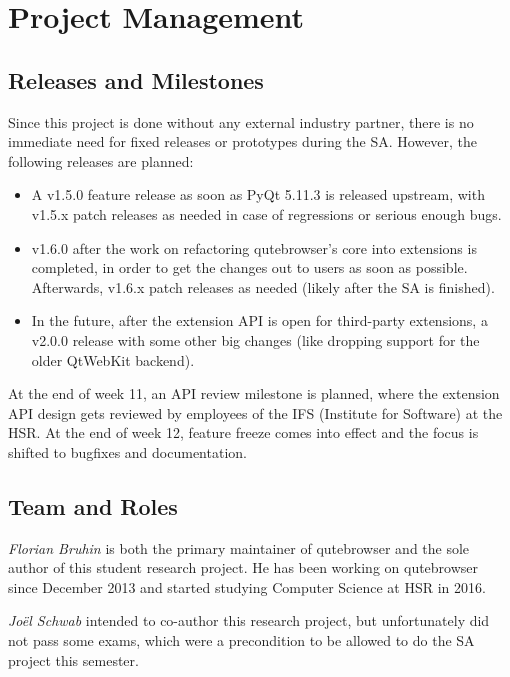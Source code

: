 
\chapter{Project Management}
\label{ch:projectman}

\section{Releases and Milestones}
\label{sec:releases}

Since this project is done without any external industry partner, there is no
immediate need for fixed releases or prototypes during the SA. However, the
following releases are planned:

\begin{itemize}
  \item A v1.5.0 feature release as soon as PyQt 5.11.3 is released upstream,
    with v1.5.x patch releases as needed in case of regressions or serious
    enough bugs.
  \item v1.6.0 after the work on refactoring qutebrowser's core into extensions
    is completed, in order to get the changes out to users as soon as possible.
    Afterwards, v1.6.x patch releases as needed (likely after the SA is finished).
  \item In the future, after the extension API is open for third-party
    extensions, a v2.0.0 release with some other big changes (like dropping support
    for the older QtWebKit backend).
\end{itemize}

At the end of week 11, an API review milestone is planned, where the extension
API design gets reviewed by employees of the IFS (Institute for Software) at the
HSR. At the end of week 12, feature freeze comes into effect and the focus is
shifted to bugfixes and documentation.

\section{Team and Roles}
\label{sec:team}
\emph{Florian Bruhin} is both the primary maintainer of qutebrowser and the
sole author of this student research project. He has been working on qutebrowser since
December 2013 and started studying Computer Science at HSR in 2016.

\emph{Joël Schwab} intended to co-author this research project, but
unfortunately did not pass some exams, which were a precondition to be allowed to
do the SA project this semester.

